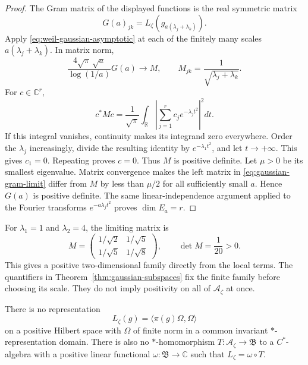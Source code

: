 \documentclass[11pt]{article}
\numberwithin{equation}{section}
\newcommand{\cA}{\mathcal A}
\newcommand{\R}{\mathbb R}
\newcommand{\C}{\mathbb C}
\begin{document}
\begin{proof}
The Gram matrix of the displayed functions is the real symmetric matrix
\[
 G(a)_{jk}=L_\zeta(g_{a(\lambda_j+\lambda_k)}).
\]
Apply \eqref{eq:weil-gaussian-asymptotic} at each of the finitely many
scales $a(\lambda_j+\lambda_k)$.  In matrix norm,
\begin{equation}
 \frac{4\sqrt\pi\,\sqrt a}{\log(1/a)}G(a)
 \longrightarrow M,
 \qquad M_{jk}=\frac1{\sqrt{\lambda_j+\lambda_k}}.
 \label{eq:gaussian-gram-limit}
\end{equation}
For $c\in\C^r$,
\begin{equation}
 c^*Mc=\frac1{\sqrt\pi}\int_{\R}
       \left|\sum_{j=1}^r c_j e^{-\lambda_j t^2}\right|^2dt.
 \label{eq:limiting-gaussian-gram}
\end{equation}
If this integral vanishes, continuity makes its integrand zero everywhere.
Order the $\lambda_j$ increasingly, divide the resulting identity by
$e^{-\lambda_1t^2}$, and let $t\to+\infty$.
This gives $c_1=0$.  Repeating proves $c=0$.
Thus $M$ is positive definite.
Let $\mu>0$ be its smallest eigenvalue.  Matrix convergence makes the
left matrix in \eqref{eq:gaussian-gram-limit} differ from $M$ by less
than $\mu/2$ for all sufficiently small $a$.
Hence $G(a)$ is positive definite.
The same linear-independence argument applied to the Fourier transforms
$e^{-a\lambda_jt^2}$ proves $\dim E_a=r$.
\end{proof}

For $\lambda_1=1$ and $\lambda_2=4$, the limiting matrix is
\[
 M=\begin{pmatrix}1/\sqrt2&1/\sqrt5\\1/\sqrt5&1/\sqrt8\end{pmatrix},
 \qquad\det M=\frac1{20}>0.
\]
This gives a positive two-dimensional family directly from the local terms.
The quantifiers in Theorem~\ref{thm:gaussian-subspaces} fix the finite family
before choosing its scale.  They do not imply positivity on all of
$\cA_\zeta$ at once.

\begin{corollary}
\label{cor:weil-carriers}
There is no representation
\[
 L_\zeta(g)=\langle\pi(g)\Omega,\Omega\rangle
\]
on a positive Hilbert space with $\Omega$ of finite norm in a common
invariant $*$-representation domain.
There is also no $*$-homomorphism $T:\cA_\zeta\to\mathfrak B$ to a
$C^*$-algebra with a positive linear functional
$\omega:\mathfrak B\to\C$ such that $L_\zeta=\omega\circ T$.
\end{corollary}
\end{document}
